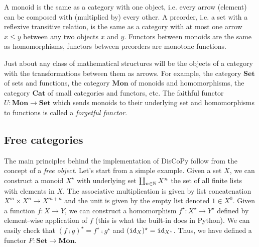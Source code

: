 \begin{example}
A monoid is the same as a category with one object, i.e. every arrow (element) can be composed with (multiplied by) every other.
A preorder, i.e. a set with a reflexive transitive relation, is the same as a category with at most one arrow $x \leq y$ between any two objects $x$ and $y$.
Functors between monoids are the same as homomorphisms, functors between preorders are monotone functions.
\end{example}

\begin{example}
Just about any class of mathematical structures will be the objects of a category with the transformations between them as arrows.
For example, the category $\mathbf{Set}$ of sets and functions, the category $\mathbf{Mon}$ of monoids and homomorphisms, the category $\mathbf{Cat}$ of small categories and functors, etc.
The faithful functor $U : \mathbf{Mon} \to \mathbf{Set}$ which sends monoids to their underlying set and homomorphisms to functions is called a \emph{forgetful functor}.
\end{example}

\subsection{Free categories}

The main principles behind the implementation of DisCoPy follow from the concept of a \emph{free object}.
Let's start from a simple example.
Given a set $X$, we can construct a monoid $X^\star$ with underlying set $\coprod_{n \in \mathbb{N}} X^n$ the set of all finite lists with elements in $X$.
The associative multiplication is given by list concatenation $X^m \times X^n \to X^{m + n}$ and the unit is given by the empty list denoted $1 \in X^0$.
Given a function $f : X \to Y$, we can construct a homomorphism $f^\star : X^\star \to Y^\star$ defined by element-wise application of $f$ (this is what the built-in  does in Python).
We can easily check that $(f \fcmp g)^\star = f^\star \fcmp g^\star$ and $(\mathtt{id}_X)^\star = \mathtt{id}_{X^\star}$.
Thus, we have defined a functor $F : \mathbf{Set} \to \mathbf{Mon}$.

